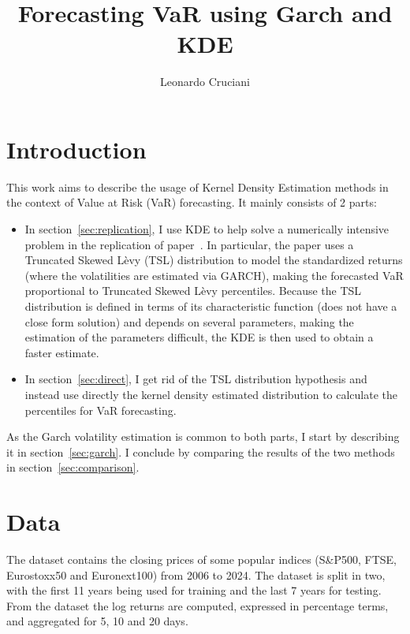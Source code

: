 \documentclass[11pt]{article}
\author{Leonardo Cruciani}
\title{Forecasting VaR using Garch and KDE}
\begin{document}
    \maketitle
    \section{Introduction}
        This work aims to describe the usage of Kernel Density Estimation methods in the context of Value at Risk (VaR) forecasting.
        It mainly consists of 2 parts:
        \begin{itemize}
            \item In section~\ref{sec:replication}, I use KDE to help solve a numerically intensive problem in the replication of paper~\cite{thorsten}.
            In particular, the paper uses a Truncated Skewed Lèvy (TSL) distribution to model the standardized returns (where the volatilities are estimated via GARCH),
            making the forecasted VaR proportional to Truncated Skewed Lèvy percentiles.
            Because the TSL distribution is defined in terms of its characteristic function (does not have a close form solution) and depends on several parameters, making the estimation of the parameters difficult, the KDE is then used to obtain a faster estimate.
            \item In section~\ref{sec:direct}, I get rid of the TSL distribution hypothesis and instead use directly the kernel density estimated distribution to calculate the percentiles for VaR forecasting.
        \end{itemize}
        As the Garch volatility estimation is common to both parts, I start by describing it in section~\ref{sec:garch}.
        I conclude by comparing the results of the two methods in section~\ref{sec:comparison}.

    \section{Data}
        The dataset contains the closing prices of some popular indices (S\&P500, FTSE, Eurostoxx50 and Euronext100) from 2006 to 2024.
        The dataset is split in two, with the first 11 years being used for training and the last 7 years for testing.
        From the dataset the log returns are computed, expressed in percentage terms, and aggregated for 5, 10 and 20 days.
\end{document}
